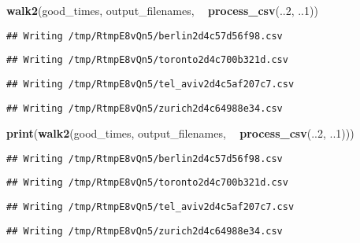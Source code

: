 \documentclass[]{book}
\newenvironment{Shaded}{\begin{snugshade}}{\end{snugshade}}
\newcommand{\DecValTok}[1]{\textcolor[rgb]{0.00,0.00,0.81}{#1}}
\newcommand{\KeywordTok}[1]{\textcolor[rgb]{0.13,0.29,0.53}{\textbf{#1}}}
\newcommand{\NormalTok}[1]{#1}
\newcommand{\OperatorTok}[1]{\textcolor[rgb]{0.81,0.36,0.00}{\textbf{#1}}}
\newcommand{\StringTok}[1]{\textcolor[rgb]{0.31,0.60,0.02}{#1}}
\begin{document}
\begin{Shaded}
\begin{Highlighting}[]
\KeywordTok{walk2}\NormalTok{(good_times, output_filenames, }\OperatorTok{~}\StringTok{ }\KeywordTok{process_csv}\NormalTok{(..}\DecValTok{2}\NormalTok{, ..}\DecValTok{1}\NormalTok{))}
\end{Highlighting}
\end{Shaded}

\begin{verbatim}
## Writing /tmp/RtmpE8vQn5/berlin2d4c57d56f98.csv
\end{verbatim}

\begin{verbatim}
## Writing /tmp/RtmpE8vQn5/toronto2d4c700b321d.csv
\end{verbatim}

\begin{verbatim}
## Writing /tmp/RtmpE8vQn5/tel_aviv2d4c5af207c7.csv
\end{verbatim}

\begin{verbatim}
## Writing /tmp/RtmpE8vQn5/zurich2d4c64988e34.csv
\end{verbatim}

\begin{Shaded}
\begin{Highlighting}[]
\KeywordTok{print}\NormalTok{(}\KeywordTok{walk2}\NormalTok{(good_times, output_filenames, }\OperatorTok{~}\StringTok{ }\KeywordTok{process_csv}\NormalTok{(..}\DecValTok{2}\NormalTok{, ..}\DecValTok{1}\NormalTok{)))}
\end{Highlighting}
\end{Shaded}

\begin{verbatim}
## Writing /tmp/RtmpE8vQn5/berlin2d4c57d56f98.csv
\end{verbatim}

\begin{verbatim}
## Writing /tmp/RtmpE8vQn5/toronto2d4c700b321d.csv
\end{verbatim}

\begin{verbatim}
## Writing /tmp/RtmpE8vQn5/tel_aviv2d4c5af207c7.csv
\end{verbatim}

\begin{verbatim}
## Writing /tmp/RtmpE8vQn5/zurich2d4c64988e34.csv
\end{verbatim}
\end{document}
